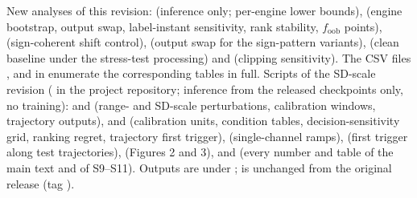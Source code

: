 \documentclass[10pt,a4paper]{article}
\newif\ifanon
\begin{document}
{\sloppy \noindent New analyses of this revision:  (inference only; per-engine lower bounds),  (engine bootstrap, output swap, label-instant sensitivity, rank stability, $f_{\mathrm{oob}}$ points),  (sign-coherent shift control),  (output swap for the sign-pattern variants),  (clean baseline under the stress-test processing) and  (clipping sensitivity). The CSV files ,  and  in  enumerate the corresponding tables in full. Scripts of the SD-scale revision ( in the project repository; inference from the released checkpoints only, no training):  and  (range- and SD-scale perturbations, calibration windows, trajectory outputs),  and  (calibration units, condition tables, decision-sensitivity grid, ranking regret, trajectory first trigger),  (single-channel ramps),  (first trigger along test trajectories),  (Figures 2 and 3),  and  (every number and table of the main text and of S9--S11). Outputs are under ;  is unchanged from the original release\ifanon\else{} (tag )\fi.}
\end{document}
